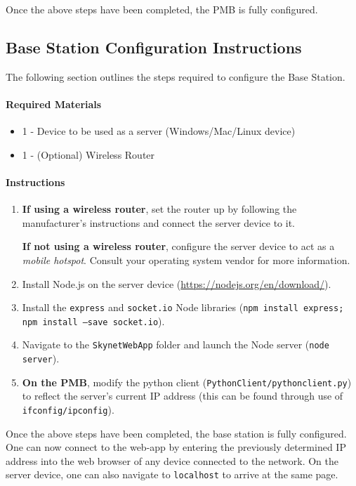 \documentclass[10pt,letterpaper]{article}
\begin{document}
Once the above steps have been completed, the PMB is fully configured.

\subsection{Base Station Configuration Instructions}
\label{bs_inst}
The following section outlines the steps required to configure the Base Station. 

\paragraph{Required Materials}
\begin{itemize}
\item 1 - Device to be used as a server (Windows/Mac/Linux device)
\item 1 - (Optional) Wireless Router
\end{itemize}

\paragraph{Instructions}
\begin{enumerate}
\item \textbf{If using a wireless router}, set the router up by following the manufacturer's instructions and connect the server device to it.

\textbf{If not using a wireless router}, configure the server device to act as a \textit{mobile hotspot}. Consult your operating system vendor for more information.
\item Install Node.js on the server device (\url{https://nodejs.org/en/download/}).
\item Install the \texttt{express} and \texttt{socket.io} Node libraries (\texttt{npm install express; npm install --save socket.io}).
\item Navigate to the \texttt{SkynetWebApp} folder and launch the Node server (\texttt{node server}). 
\item \textbf{On the PMB}, modify the python client (\texttt{PythonClient/pythonclient.py}) to reflect the server's current IP address (this can be found through use of \texttt{ifconfig/ipconfig}).
\end{enumerate}


Once the above steps have been completed, the base station is fully configured. One can now connect to the web-app by entering the previously determined IP address into the web browser of any device connected to the network. On the server device, one can also navigate to \texttt{localhost} to arrive at the same page.
\end{document}
